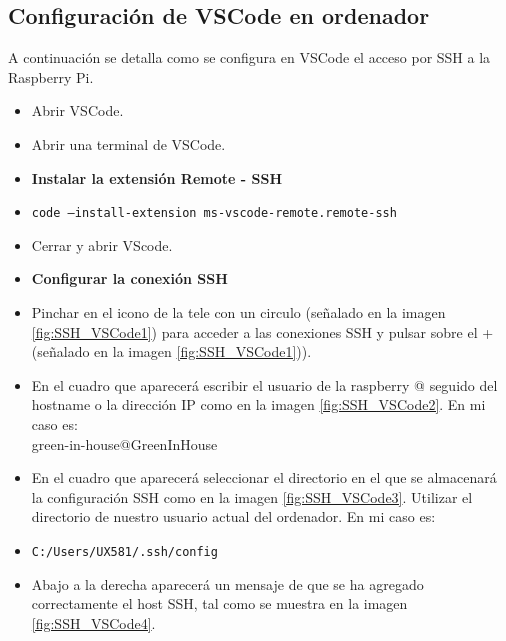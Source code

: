         \subsection{Configuración de VSCode en ordenador}
        A continuación se detalla como se configura en VSCode el acceso por SSH a la Raspberry Pi.
        \begin{itemize}
            \item Abrir VSCode.
            \item Abrir una terminal de VSCode.
            \item \textbf{Instalar la extensión Remote - SSH}
            \item \texttt{code --install-extension ms-vscode-remote.remote-ssh}
            \item Cerrar y abrir VScode.
            \item \textbf{Configurar la conexión SSH}
            \item Pinchar en el icono de la tele con un circulo (señalado en la imagen \ref{fig:SSH_VSCode1}) para acceder a las conexiones SSH y pulsar sobre el + (señalado en la imagen \ref{fig:SSH_VSCode1})).
            \\ 
            \item En el cuadro que aparecerá escribir el usuario de la raspberry @ seguido del hostname o la dirección IP como en la imagen \ref{fig:SSH_VSCode2}. En mi caso es:
            \\ green-in-house@GreenInHouse
            \\ 
            \item En el cuadro que aparecerá seleccionar el directorio en el que se almacenará la configuración SSH como en la imagen \ref{fig:SSH_VSCode3}. Utilizar el directorio de nuestro usuario actual del ordenador. En mi caso es:
            \item \texttt{C:/Users/UX581/.ssh/config}
            \\ 
            \item Abajo a la derecha aparecerá un mensaje de que se ha agregado correctamente el host SSH, tal como se muestra en la imagen \ref{fig:SSH_VSCode4}.
            \\ 

\end{itemize}
